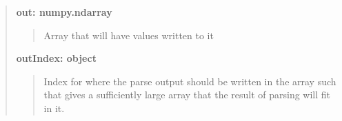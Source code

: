 \documentclass[letterpaper,10pt,english]{sphinxmanual}
\begin{document}
\begin{fulllineitems}
\begin{fulllineitems}
\begin{quote}
\begin{description}
\textbf{out: numpy.ndarray}
\begin{quote}

Array that will have values written to it
\end{quote}

\textbf{outIndex: object}
\begin{quote}

Index for where the parse output should be written in the 
array such that  gives a sufficiently large array
that the result of parsing will fit in it.
\end{quote}

\end{description}\end{quote}

\end{fulllineitems}


\end{fulllineitems}

\end{document}
